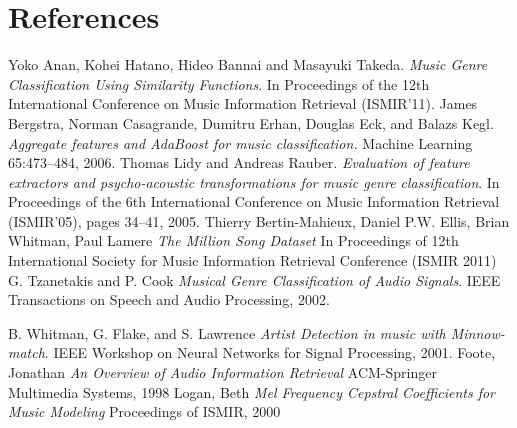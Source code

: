 \documentclass[twocolumn]{article}
\begin{document}
\section*{References}
\begin{thebibliography}{99}
  Yoko Anan, Kohei Hatano, Hideo Bannai and Masayuki Takeda.
  \emph{Music Genre Classification Using Similarity Functions}.
  In Proceedings of the 12th International Conference on Music Information
  Retrieval (ISMIR'11).
  James Bergstra, Norman Casagrande, Dumitru Erhan, Douglas Eck, and Balazs
  Kegl.
  \emph{Aggregate features and AdaBoost for music classiﬁcation.}
  Machine Learning 65:473–484, 2006.
  Thomas Lidy and Andreas Rauber.
  \emph{Evaluation of feature extractors and psycho-acoustic transformations for
  music genre classiﬁcation}.
  In Proceedings of the 6th International Conference on Music Information
  Retrieval (ISMIR'05), pages 34–41, 2005.
  Thierry Bertin-Mahieux, Daniel P.W. Ellis, Brian Whitman, Paul Lamere
  \emph{The Million Song Dataset}
  In Proceedings of 12th International Society for Music Information Retrieval Conference (ISMIR 2011)
	G. Tzanetakis and P. Cook
	\emph{Musical Genre Classification of Audio Signals}.
	IEEE Transactions on Speech and Audio Processing,
	2002.

	B. Whitman, G. Flake, and S. Lawrence
	\emph{Artist Detection in music with Minnow-match}.
	IEEE Workshop on Neural Networks for Signal Processing,
	2001.
	Foote, Jonathan
	\emph{An Overview of Audio Information Retrieval}
	ACM-Springer Multimedia Systems,
	1998
	Logan, Beth
	\emph{Mel Frequency Cepstral Coefficients for Music Modeling}
	Proceedings of ISMIR,
	2000

\end{thebibliography}
\end{document}
